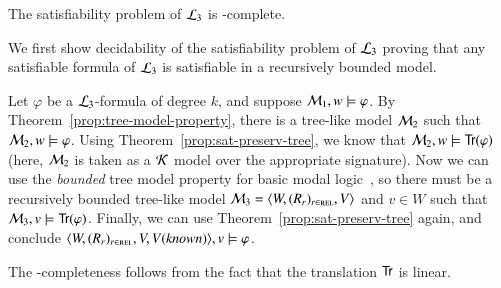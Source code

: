 \begin{thm}\label{thm:fmp}
The satisfiability problem of $\mathcal{L}_3$ is \pspace-complete.
\end{thm}

\begin{pf}
We first show decidability of the satisfiability problem of
$\mathcal{L}_3$ proving that any satisfiable formula of $\mathcal{L}_3$ is
satisfiable in a recursively bounded model.

Let $\varphi$ be a $\mathcal{L}_3$-formula of degree $k$, and suppose
$\mathcal{M}_1,w \models \varphi$. By
Theorem~\ref{prop:tree-model-property}, there is a tree-like model
$\mathcal{M}_2$ such that $\mathcal{M}_2,w \models \varphi$. Using
Theorem~\ref{prop:sat-preserv-tree}, we know that $\mathcal{M}_2,w \models
{\sf Tr}(\varphi)$ (here, $\mathcal{M}_2$ is taken as a $\mathcal{K}$ model over the appropriate
signature). Now we can use the \emph{bounded} tree model property
for basic modal logic~\cite{BRV01}, so there must be a recursively
bounded tree-like model $\mathcal{M}_3=\langle W,(R_r)_{r \in \textsc{rel}},V \rangle$ and $v \in W$ such
that $\mathcal{M}_3,v \models {\sf Tr}(\varphi)$. Finally, we can use
Theorem~\ref{prop:sat-preserv-tree} again, and conclude
$\langle W,(R_r)_{r \in \textsc{rel}},V,V(\mathit{known}) \rangle,v \models \varphi$.
%

The \pspace-completeness follows from the fact that the translation
${\sf Tr}$ is linear.
\end{pf}




